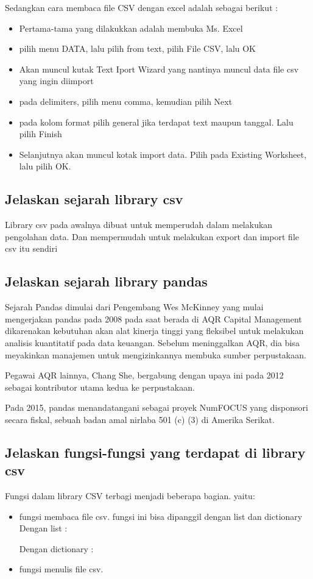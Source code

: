 Sedangkan cara membaca file CSV dengan excel adalah sebagai berikut :
	\begin{itemize}
	\item Pertama-tama yang dilakukkan adalah membuka Ms. Excel
	\item pilih menu DATA, lalu pilih from text, pilih File CSV, lalu OK
	\item Akan muncul kutak Text Iport Wizard yang nantinya muncul data file csv yang ingin diimport
	\item pada delimiters, pilih menu comma, kemudian pilih Next
	\item pada kolom format pilih general jika terdapat text maupun tanggal. Lalu pilih Finish
	\item Selanjutnya akan muncul kotak import data. Pilih pada Existing Worksheet, lalu pilih OK.
	\end{itemize}

\subsection{Jelaskan sejarah library csv}
Library csv pada awalnya dibuat untuk memperudah dalam melakukan pengolahan data. Dan mempermudah untuk melakukan export dan import file csv itu sendiri

\subsection{Jelaskan sejarah library pandas}
Sejarah Pandas dimulai dari Pengembang Wes McKinney yang mulai mengerjakan pandas pada 2008 pada saat berada di AQR Capital Management dikarenakan kebutuhan akan alat kinerja tinggi yang fleksibel untuk melakukan analisis kuantitatif pada data keuangan. Sebelum meninggalkan AQR, dia bisa meyakinkan manajemen untuk mengizinkannya membuka sumber perpustakaan.

Pegawai AQR lainnya, Chang She, bergabung dengan upaya ini pada 2012 sebagai kontributor utama kedua ke perpustakaan.

Pada 2015, pandas menandatangani sebagai proyek NumFOCUS yang disponsori secara fiskal, sebuah badan amal nirlaba 501 (c) (3) di Amerika Serikat.

\subsection{Jelaskan fungsi-fungsi yang terdapat di library csv}
Fungsi dalam library CSV terbagi menjadi beberapa bagian. yaitu:
	\begin{itemize}
	\item fungsi membaca file csv.
    	fungsi ini bisa dipanggil dengan list dan dictionary
    	Dengan list :
    	
    	Dengan dictionary :
    	
   	 \item fungsi menulis file csv.
    	
	\end{itemize}

